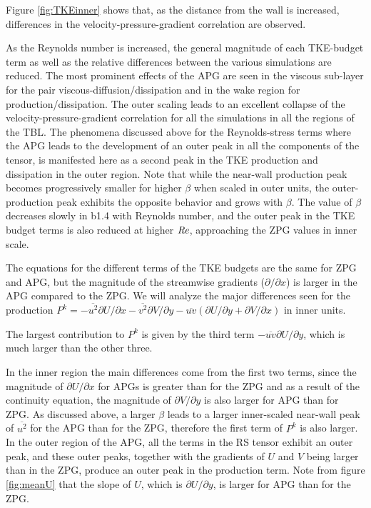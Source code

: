 Figure \ref{fig:TKEinner} shows that, as the distance from the wall is increased, differences in the velocity-pressure-gradient correlation are observed.

As the Reynolds number is increased, the general magnitude of each TKE-budget term as well as the relative differences between the various simulations are reduced. The most prominent effects of the APG are seen in the viscous sub-layer for the pair viscous-diffusion/dissipation and in the wake region for production/dissipation.
The outer scaling leads to an excellent collapse of the velocity-pressure-gradient correlation for all the simulations in all the regions of the TBL.
The phenomena discussed above for the Reynolds-stress terms where the APG leads to the development of an outer peak in all the components of the tensor, is manifested here as a second peak in the TKE production and dissipation in the outer region. Note that while the near-wall production peak becomes progressively smaller for higher $\beta$ when scaled in outer units, the outer-production peak exhibits the opposite behavior and grows with $\beta$. The value of $\beta$ decreases slowly in b1.4 with Reynolds number, and the outer peak in the TKE budget terms is also reduced at higher $\mbox{\textit{Re}}$, approaching the ZPG values in inner scale.


   
The equations for the different terms of the TKE budgets are the same for ZPG and APG, but the magnitude of the streamwise gradients ($\partial / \partial x$) is larger in the APG compared to the ZPG.
We will analyze the major differences seen for the production $P^k=-\overline{u^2}\partial U/ \partial x -\overline{v^2}\partial V/ \partial y -\overline{uv} (\partial U/ \partial y + \partial V/ \partial x)$ in inner units.
   
The largest contribution to $P^k$ is given by the third term $-\overline{uv} \partial U/ \partial y$, which is much larger than the other three. 

   
In the inner region the main differences come from the first two terms, since the magnitude of $\partial U/ \partial x$ for APGs is greater than for the ZPG and as a result of the continuity equation, the magnitude of $\partial V/ \partial y$ is also larger for APG than for ZPG. As discussed above, a larger $\beta$ leads to a larger inner-scaled near-wall peak of $\overline{u^2}$ for the APG than for the ZPG, therefore the first term of $P^k$ is also larger. In the outer region of the APG, all the terms in the RS tensor exhibit an outer peak, and these outer peaks, together with the gradients of $U$ and $V$ being larger than in the ZPG, produce an outer peak in the production term. Note from figure \ref{fig:meanU} that the slope of $U$, which is $\partial U/ \partial y$, is larger for APG than for the ZPG.



